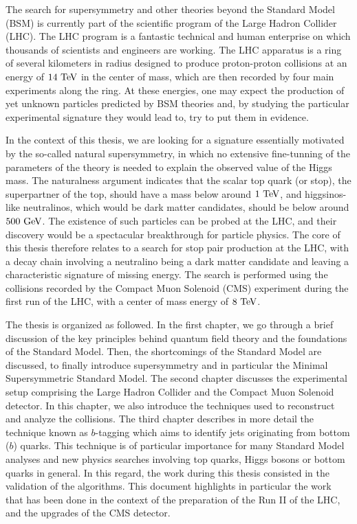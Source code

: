 The search for supersymmetry and other theories beyond the Standard Model (BSM)
is currently part of the scientific program of the Large Hadron Collider (LHC).
The LHC program is a fantastic technical and human enterprise on which thousands
of scientists and engineers are working. The LHC apparatus is a ring of several
kilometers in radius designed to produce proton-proton collisions at an energy
of $14~\text{TeV}$ in the center of mass, which are then recorded by four main
experiments along the ring. At these energies, one may expect the production of
yet unknown particles predicted by BSM theories and, by studying the particular
experimental signature they would lead to, try to put them in evidence.

In the context of this thesis, we are looking for a signature essentially
motivated by the so-called natural supersymmetry, in which no extensive
fine-tunning of the parameters of the theory is needed to explain the observed
value of the Higgs mass. The naturalness argument indicates that the scalar top
quark (or stop), the superpartner of the top, should have a mass below around
$1~\text{TeV}$, and higgsinos-like neutralinos, which would be dark matter candidates,
should be below around $500~\text{GeV}$. The existence of such particles can be probed
at the LHC, and their discovery would be a spectacular breakthrough for particle
physics.  The core of this thesis therefore relates to a search for stop pair
production at the LHC, with a decay chain involving a neutralino being a dark
matter candidate and leaving a characteristic signature of missing energy. The
search is performed using the collisions recorded by the Compact Muon Solenoid
(CMS) experiment during the first run of the LHC, with a center of mass energy
of $8~\text{TeV}$.

The thesis is organized as followed. In the first chapter, we go through a brief
discussion of the key principles behind quantum field theory and the foundations
of the Standard Model. Then, the shortcomings of the Standard Model are
discussed, to finally introduce supersymmetry and in particular the Minimal
Supersymmetric Standard Model. The second chapter discusses the experimental
setup comprising the Large Hadron Collider and the Compact Muon Solenoid
detector. In this chapter, we also introduce the techniques used to reconstruct
and analyze the collisions. The third chapter describes in more detail the
technique known as $b$-tagging which aims to identify jets originating from
bottom ($b$) quarks. This technique is of particular importance for many
Standard Model analyses and new physics searches involving top quarks, Higgs
bosons or bottom quarks in general. In this regard, the work during this thesis
consisted in the validation of the algorithms. This document highlights in
particular the work that has been done in the context of the preparation of the
Run II of the LHC, and the upgrades of the CMS detector.

